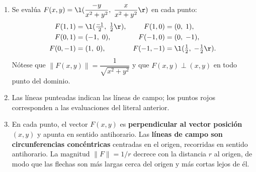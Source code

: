 \documentclass[11pt,respuestas,a4]{aleph-examen}
\begin{document}
\begin{preguntas}
\begin{respuesta}\hspace{0pt}
\begin{enumerate}
    \item Se evalúa $F(x,y)=\l(\dfrac{-y}{x^2+y^2},\;\dfrac{x}{x^2+y^2}\r)$ en cada punto:
    \begin{align*}
        F(1,1)   &= \l(\tfrac{-1}{2},\;\tfrac{1}{2}\r), &
        F(1,0)   &= (0,\;1), \\
        F(0,1)   &= (-1,\;0), &
        F(-1,0)  &= (0,\;-1), \\
        F(0,-1)  &= (1,\;0), &
        F(-1,-1) &= \l(\tfrac{1}{2},\;-\tfrac{1}{2}\r).
    \end{align*}
    Nótese que $\|F(x,y)\|=\dfrac{1}{\sqrt{x^2+y^2}}$ y que $F(x,y)\perp(x,y)$ en todo punto del dominio.

    \item Las líneas punteadas indican las líneas de campo; los puntos rojos corresponden a las evaluaciones del literal anterior.
    \begin{center}
    \end{center}

    \item En cada punto, el vector $F(x,y)$ es \textbf{perpendicular al vector posición} $(x,y)$ y apunta en sentido antihorario. Las \textbf{líneas de campo son circunferencias concéntricas} centradas en el origen, recorridas en sentido antihorario. La magnitud $\|F\|=1/r$ decrece con la distancia $r$ al origen, de modo que las flechas son más largas cerca del origen y más cortas lejos de él.


\end{enumerate}
\end{respuesta}
\end{preguntas}
\end{document}
